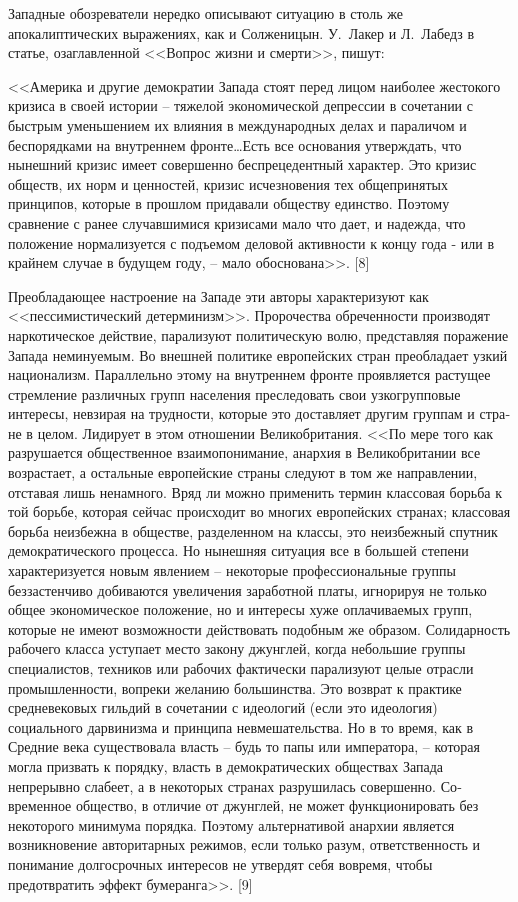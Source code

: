 \documentclass{book}
\begin{document}
Западные обозреватели нередко описывают ситуацию в столь же апокалиптических выражениях, как и Солженицын. У.~Лакер и Л.~Лабедз в статье, озаглавленной <<Вопрос жизни и смерти>>, пишут:

<<Америка и другие демократии Запада стоят перед лицом наиболее жестокого кризиса в своей истории -- тяжелой эконо­мической депрессии в сочетании с быстрым уменьшением их влияния в международных делах и параличом и беспорядками на внутреннем фронте\ldots Есть все основания утверждать, что нынешний кризис имеет совершенно беспрецедентный харак­тер. Это кризис обществ, их норм и ценностей, кризис исчез­новения тех общепринятых принципов, которые в прошлом придавали обществу единство. Поэтому сравнение с ранее слу­чавшимися кризисами мало что дает, и надежда, что положе­ние нормализуется с подъемом деловой активности к концу года - или в крайнем случае в будущем году, -- мало обосно­вана>>. [8]

Преобладающее настроение на Западе эти авторы характе­ризуют как <<пессимистический детерминизм>>. Пророчества обреченности производят наркотическое действие, парализуют политическую волю, представляя поражение Запада немину­емым. Во внешней политике европейских стран преобладает узкий национализм. Параллельно этому на внутреннем фрон­те проявляется растущее стремление различных групп населе­ния преследовать свои узкогрупповые интересы, невзирая на трудности, которые это доставляет другим группам и стра­не в целом. Лидирует в этом отношении Великобритания. <<По мере того как разрушается общественное взаимопонимание, анархия в Великобритании все возрастает, а остальные евро­пейские страны следуют в том же направлении, отставая лишь ненамного. Вряд ли можно применить термин классовая борьба к  той борьбе, которая сейчас происходит во многих евро­пейских странах; классовая борьба неизбежна в обществе, раз­деленном на классы, это неизбежный спутник демократиче­ского процесса. Но нынешняя ситуация все в большей 
степени характеризуется новым явлением -- некоторые професси­ональные группы беззастенчиво добиваются увеличения зара­ботной платы, игнорируя не только общее экономическое положение, но и интересы хуже оплачиваемых групп, которые не имеют возможности действовать подобным же образом. Солидарность рабочего класса уступает место закону джунг­лей, когда небольшие группы специалистов, техников или ра­бочих фактически парализуют целые отрасли промышленно­сти, вопреки желанию большинства. Это возврат к практике средневековых гильдий в сочетании с идеологий (если это идеология) социального дарвинизма и принципа невмешатель­ства. Но в то время, как в Средние века существовала власть -- будь то папы или императора, -- которая могла призвать к поряд­ку, власть в демократических обществах Запада непрерывно слабеет, а в некоторых странах разрушилась совершенно. Со­временное общество, в отличие от джунглей, не может функ­ционировать без некоторого минимума порядка. Поэтому альтернативой анархии является возникновение 
авторитарных режимов, если только разум, ответственность и понимание долгосрочных интересов не утвердят себя вовремя, чтобы предотвратить эффект бумеранга>>. [9]
\end{document}

